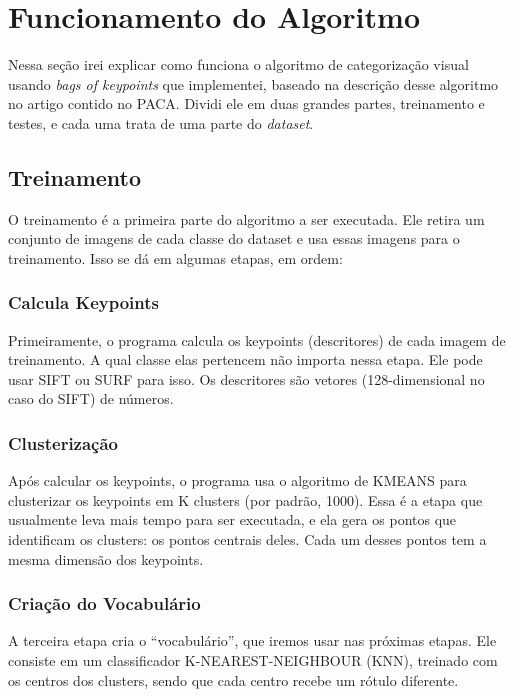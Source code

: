 




\cabecalho


\section{Funcionamento do Algoritmo}
Nessa seção irei explicar como funciona o algoritmo de categorização visual usando 
\textit{bags of keypoints} que implementei, baseado na descrição desse algoritmo no
artigo contido no PACA. Dividi ele em duas grandes partes,
treinamento e testes, e cada uma trata de uma parte do \textit{dataset}.

\subsection{Treinamento}
O treinamento é a primeira parte do algoritmo a ser executada. Ele retira um conjunto
de imagens de cada classe do dataset e usa essas imagens para o treinamento. Isso se dá em algumas etapas, em ordem:

\subsubsection{Calcula Keypoints}
Primeiramente, o programa calcula os keypoints (descritores) de cada imagem de treinamento. A qual classe
elas pertencem não importa nessa etapa. Ele pode usar SIFT ou SURF para isso. Os descritores são
vetores (128-dimensional no caso do SIFT) de números.

\subsubsection{Clusterização}
Após calcular os keypoints, o programa usa o algoritmo de KMEANS para clusterizar os keypoints
em K clusters (por padrão, 1000). Essa é a etapa que usualmente leva mais tempo para ser executada,
e ela gera os pontos que identificam os clusters: os pontos centrais deles. Cada um desses pontos tem
a mesma dimensão dos keypoints.

\subsubsection{Criação do Vocabulário}
A terceira etapa cria o ``vocabulário'', que iremos usar nas próximas etapas. Ele consiste em um
classificador K-NEAREST-NEIGHBOUR (KNN), treinado com os centros dos clusters, sendo que cada
centro recebe um rótulo diferente.

